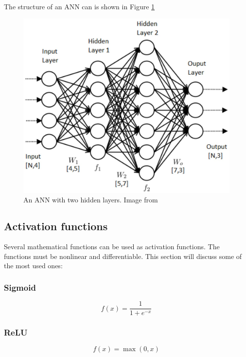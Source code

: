 \documentclass[thesis=B,english]{FITthesis}[2019/12/23]
\begin{document}
The structure of an ANN can is shown in Figure \ref{fig_ann}

\begin{figure}[ht]
		\includegraphics[scale=0.25]{images/ANN.png}
		\centering
		\caption{An ANN with two hidden layers. Image from \cite{ANN_handbook_1}}
		\label{fig_ann}
\end{figure}

\subsection{Activation functions}
Several mathematical functions can be used as activation functions. The functions must be nonlinear and differentiable. This section will discuss some of the most used ones\cite{act_fnc_2020}:

\subsubsection*{Sigmoid}
\begin{equation}
    f(x) = \frac{1}{1 + e^{-x}}
\end{equation}

\subsubsection*{ReLU}
\begin{equation}
    f(x) = \max(0, x)
\end{equation}
\end{document}
